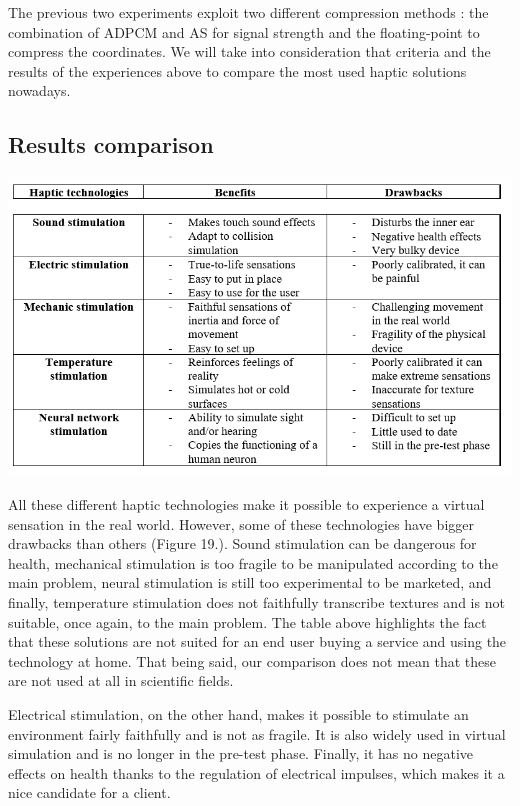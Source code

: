 \documentclass[12pt, a4paper]{article}
\begin{document}
\begin{multicols}{2}
The previous two experiments exploit two different compression methods : the combination of ADPCM and AS for signal strength and the floating-point to compress the coordinates. We will take into consideration that criteria and the results of the experiences above to compare the most used haptic solutions nowadays.

\subsection{Results comparison}

\captionsetup{type=figure}
\includegraphics[width=.49\textwidth]{comparison.png}
\vspace*{3mm}

All these different haptic technologies make it possible to experience a virtual sensation in the real world. However, some of these technologies have bigger drawbacks than others (Figure 19.). Sound stimulation can be dangerous for health, mechanical stimulation is too fragile to be manipulated according to the main problem, neural stimulation is still too experimental to be marketed, and finally, temperature stimulation does not faithfully transcribe textures and is not suitable, once again, to the main problem. The table above highlights the fact that these solutions are not suited for an end user buying a service and using the technology at home. That being said, our comparison does not mean that these are not used at all in scientific fields.

\vspace*{3mm}

Electrical stimulation, on the other hand, makes it possible to stimulate an environment fairly faithfully and is not as fragile. It is also widely used in virtual simulation and is no longer in the pre-test phase. Finally, it has no negative effects on health thanks to the regulation of electrical impulses, which makes it a nice candidate for a client.


\end{multicols}
\end{document}
